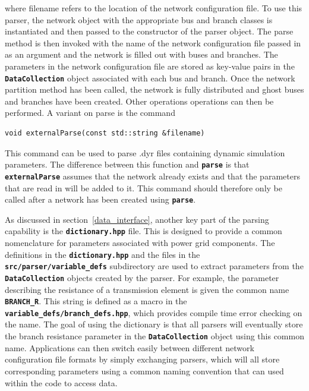 where filename refers to the location of the network configuration file. To use
this parser, the network object with the appropriate bus and branch classes is
instantiated and then passed to the constructor of the parser object. The parse method is then invoked with the name of the network configuration file passed in as an argument and the network is filled out with buses and branches. The parameters in the network configuration file are stored as key-value pairs in the \texttt{\textbf{DataCollection}} object associated with each bus and branch. Once the network partition method has been called, the network is fully distributed and ghost buses and branches have been created. Other operations operations can then be performed. A variant on parse is the command

{
\color{red}
\begin{Verbatim}[fontseries=b]
void externalParse(const std::string &filename)
\end{Verbatim}
}

This command can be used to parse .dyr files containing dynamic simulation parameters. The difference between this function and \texttt{\textbf{parse}} is that \texttt{\textbf{externalParse}} assumes that the network already exists and that the parameters that are read in will be added to it. This command should therefore only be called after a network has been created using \texttt{\textbf{parse}}.

As discussed in section~\ref{data_interface}, another key part of the parsing
capability is the \texttt{\textbf{dictionary.hpp}} file. This is designed to provide a common nomenclature for parameters associated with power grid components.
The definitions in the \texttt{\textbf{dictionary.hpp}} and the files in the
\texttt{\textbf{src/parser/variable\_defs}} subdirectory are used to extract
parameters from the\newline
\texttt{\textbf{DataCollection}} objects created by the
parser. For example, the parameter describing the resistance of a transmission
element is given the common name \texttt{\textbf{BRANCH\_R}}. This string is
defined as a macro in the \texttt{\textbf{variable\_defs/branch\_defs.hpp}}, which
provides compile time error checking on the name. The goal of using the dictionary is that all parsers will eventually store the branch resistance parameter in the \texttt{\textbf{DataCollection}} object using this common name. Applications can then switch easily between different network configuration file formats by simply exchanging parsers, which will all store corresponding parameters using a common naming convention that can used within the code to access data.
\newline
\hyperlink{topDoc}{\color{blue}{Top}}
